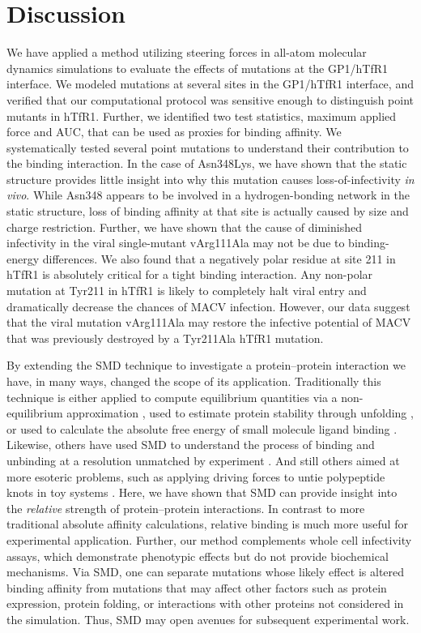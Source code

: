 \documentclass[12pt]{article}
\begin{document}
\section*{Discussion}

We have applied a method utilizing steering forces in all-atom molecular dynamics simulations to evaluate the effects of mutations at the GP1/hTfR1 interface. We modeled mutations at several sites in the GP1/hTfR1 interface, and verified that our computational protocol was sensitive enough to distinguish point mutants in hTfR1. Further, we identified two test statistics, maximum applied force and AUC, that can be used as proxies for binding affinity. We systematically tested several point mutations to understand their contribution to the binding interaction. In the case of Asn348Lys, we have shown that the static structure provides little insight into why this mutation causes loss-of-infectivity \textit{in vivo}. While Asn348 appears to be involved in a hydrogen-bonding network in the static structure, loss of binding affinity at that site is actually caused by size and charge restriction. Further, we have shown that the cause of diminished infectivity in the viral single-mutant vArg111Ala may not be due to binding-energy differences. We also found that a negatively polar residue at site 211 in hTfR1 is absolutely critical for a tight binding interaction. Any non-polar mutation at Tyr211 in hTfR1 is likely to completely halt viral entry and dramatically decrease the chances of MACV infection. However, our data suggest that the viral mutation vArg111Ala may restore the infective potential of MACV that was previously destroyed by a Tyr211Ala hTfR1 mutation.

By extending the SMD technique to investigate a protein--protein interaction we have, in many ways, changed the scope of its application. Traditionally this technique is either applied to compute equilibrium quantities via a non-equilibrium approximation \citep{Park2003,Park2004,Buch2011,Giorgino2012}, used to estimate protein stability through unfolding \citep{Lu1999}, or used to calculate the absolute free energy of small molecule ligand binding \citep{Dixit2001}. Likewise, others have used SMD to understand the process of binding and unbinding at a resolution unmatched by experiment \citep{Cuendet2011,Giorgino2012}. And still others aimed at more esoteric problems, such as applying driving forces to untie polypeptide knots in toy systems \citep{Sulkowska2010}. Here, we have shown that SMD can provide insight into the \textit{relative} strength of protein--protein interactions. In contrast to more traditional absolute affinity calculations, relative binding is much more useful for experimental application. Further, our method complements whole cell infectivity assays, which demonstrate phenotypic effects but do not provide biochemical mechanisms. Via SMD, one can separate mutations whose likely effect is altered binding affinity from mutations that may affect other factors such as protein expression, protein folding, or interactions with other proteins not considered in the simulation. Thus, SMD may open avenues for subsequent experimental work.
\end{document}
